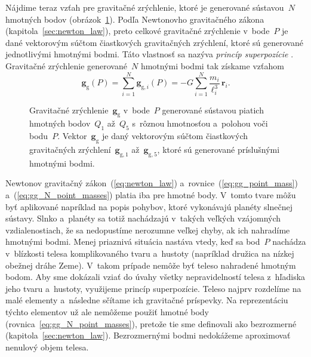 \documentclass[a4paper, 12pt]{book}
\newcommand{\gidx}{\mathrm g}
\let\vec\mathbf
\begin{document}
Nájdime teraz vzťah pre gravitačné zrýchlenie, ktoré je generované sústavou~$N$ 
hmotných bodov (obrázok~\ref{fig:gg_n_point_masses}).  Podľa Newtonovho 
gravitačného zákona  (kapitola~\ref{sec:newton_law}), preto celkové 
gravitačné zrýchlenie v~bode~$P$ je dané vektorovým súčtom čiastkových 
gravitačných zrýchlení, ktoré sú generované jednotlivými hmotnými bodmi.  Táto 
vlastnosť sa nazýva \emph{princíp superpozície} \parencite{Hotine}.  Gravitačné 
zrýchlenie generované~$N$ hmotnými bodmi tak získame vzťahom
%
\begin{equation}
\label{eq:gg_N_point_masses}
\vec g_\gidx(P) = \sum_{i = 1}^{N}\vec g_{\gidx,i}(P) = -G \sum_{i = 1}^{N}
\frac{m_i}{\ell_i^3} \, \vec{r}_i{.}
\end{equation}

\begin{figure}
\centering

\caption{Gravitačné zrýchlenie~$\vec g_\gidx$ v~bode~$P$ generované sústavou 
piatich hmotných bodov~$Q_1$ až~$Q_5$ s~rôznou hmotnosťou a~polohou voči 
bodu~$P$.  Vektor~$\vec g_\gidx$ je daný vektorovým súčtom čiastkových 
gravitačných zrýchlení~$\vec g_{\gidx,1}$ až~$\vec g_{\gidx,5}$, ktoré sú 
generované príslušnými hmotnými bodmi.}
\label{fig:gg_n_point_masses}
\end{figure}

Newtonov gravitačný zákon~(\ref{eq:newton_law}) 
a~rovnice~(\ref{eq:gg_point_mass}) a~(\ref{eq:gg_N_point_masses}) platia iba 
pre hmotné body.  V~tomto tvare môžu byť aplikované napríklad na popis pohybov, 
ktoré vykonávajú planéty slnečnej sústavy.  Slnko a~planéty sa totiž nachádzajú 
v~takých veľkých vzájomných vzdialenostiach, že sa nedopustíme nerozumne veľkej 
chyby, ak ich nahradíme hmotnými bodmi.  Menej priaznivá situácia nastáva 
vtedy, keď sa bod~$P$ nachádza v~blízkosti telesa komplikovaného tvaru 
a~hustoty (napríklad družica na nízkej obežnej dráhe Zeme).  V~takom prípade 
nemôže byť teleso nahradené hmotným bodom.  Aby sme dokázali vziať do úvahy 
všetky nepravidelností telesa z~hľadiska jeho tvaru a~hustoty, využijeme 
princíp superpozície.  Teleso najprv rozdelíme na malé elementy a~následne 
sčítame ich gravitačné príspevky.  Na reprezentáciu týchto elementov už ale 
nemôžeme použiť hmotné body (rovnica~\ref{eq:gg_N_point_masses}), pretože tie 
sme definovali ako bezrozmerné (kapitola~\ref{sec:newton_law}).  Bezrozmernými 
bodmi nedokážeme aproximovať nenulový objem telesa.
\end{document}
